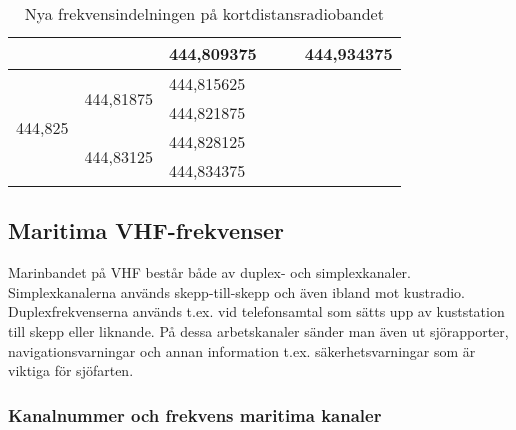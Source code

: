 \begin{table}[h]
\begin{tabular}{|l|l|l|l|l|l|}
		                                               &                                                 & 444,809375                      & \multicolumn{1}{l|}{}                         & \multicolumn{1}{l|}{}                           & \multicolumn{1}{l|}{444,934375} \\ \hline
		\multirow{4}{*}{444,825}                       & \multirow{2}{*}{444,81875}                      & 444,815625                      & \multicolumn{3}{l}{\multirow{4}{*}{}}                                                                                             \\ \cline{3-3}
		                                               &                                                 & 444,821875                      & \multicolumn{3}{l}{}                                                                                                              \\ \cline{2-3}
		                                               & \multirow{2}{*}{444,83125}                      & 444,828125                      & \multicolumn{3}{l}{}                                                                                                              \\ \cline{3-3}
		                                               &                                                 & 444,834375                      & \multicolumn{3}{l}{}                                                                                                              \\ \cline{1-3}
	\end{tabular}
\caption{Nya frekvensindelningen på kortdistansradiobandet}
\label{tab:SRBR-frekvenser}
\end{table}

\clearpage

\subsection{Maritima VHF-frekvenser}

Marinbandet på VHF består både av duplex- och simplexkanaler. Simplexkanalerna används skepp-till-skepp och även ibland mot kustradio. Duplexfrekvenserna används t.ex. vid telefonsamtal som sätts upp av kuststation till skepp eller liknande. På dessa arbetskanaler sänder man även ut sjörapporter, navigationsvarningar och annan information t.ex. säkerhetsvarningar som är viktiga för sjöfarten.

\subsubsection{Kanalnummer och frekvens maritima kanaler}

